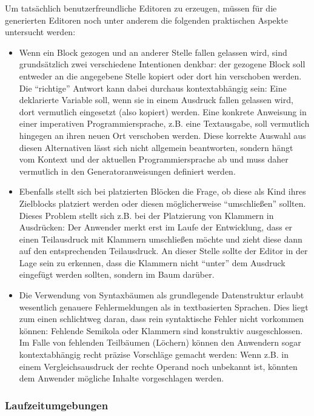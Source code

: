 \documentclass[paper=a4,fontsize=11pt,parskip=half]{scrartcl}
\begin{document}
Um tatsächlich benutzerfreundliche Editoren zu erzeugen, müssen für die generierten Editoren noch  unter anderem die folgenden praktischen Aspekte untersucht werden:

\begin{itemize}
\item Wenn ein Block gezogen und an anderer Stelle fallen gelassen wird, sind grundsätzlich zwei verschiedene Intentionen denkbar: der gezogene Block soll entweder an die angegebene Stelle kopiert oder dort hin verschoben werden. Die \enquote{richtige} Antwort kann dabei durchaus kontextabhängig sein: Eine deklarierte Variable soll, wenn sie in einem Ausdruck fallen gelassen wird, dort vermutlich eingesetzt (also kopiert) werden. Eine konkrete Anweisung in einer imperativen Programmiersprache, z.B. eine Textausgabe, soll vermutlich hingegen an ihren neuen Ort verschoben werden. Diese korrekte Auswahl aus diesen Alternativen lässt sich nicht allgemein beantworten, sondern hängt vom Kontext und der aktuellen Programmiersprache ab und muss daher vermutlich in den Generatoranweisungen definiert werden.
\item Ebenfalls stellt sich bei platzierten Blöcken die Frage, ob diese als Kind ihres Zielblocks platziert werden oder diesen möglicherweise \enquote{umschließen} sollten. Dieses Problem stellt sich z.B. bei der Platzierung von Klammern in Ausdrücken: Der Anwender merkt erst im Laufe der Entwicklung, dass er einen Teilausdruck mit Klammern umschließen möchte und zieht diese dann auf den entsprechenden Teilausdruck. An dieser Stelle sollte der Editor in der Lage sein zu erkennen, dass die Klammern nicht \enquote{unter} dem Ausdruck eingefügt werden sollten, sondern im Baum darüber.
\item Die Verwendung von Syntaxbäumen als grundlegende Datenstruktur erlaubt wesentlich genauere Fehlermeldungen als in textbasierten Sprachen. Dies liegt zum einen schlichtweg daran, dass rein syntaktische Fehler nicht vorkommen können: Fehlende Semikola oder Klammern sind konstruktiv ausgeschlossen. Im Falle von fehlenden Teilbäumen (Löchern) können den Anwendern sogar kontextabhängig recht präzise Vorschläge gemacht werden: Wenn z.B. in einem Vergleichsausdruck der rechte Operand noch unbekannt ist, könnten dem Anwender mögliche Inhalte vorgeschlagen werden.
\end{itemize}

\subsubsection{Laufzeitumgebungen}
\end{document}
